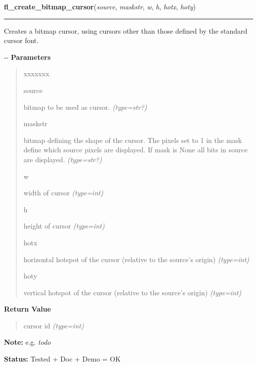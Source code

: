 \hspace{.8\funcindent}\begin{boxedminipage}{\funcwidth}

    \raggedright \textbf{fl\_create\_bitmap\_cursor}(\textit{source}, \textit{maskstr}, \textit{w}, \textit{h}, \textit{hotx}, \textit{hoty})

    \vspace{-1.5ex}

    \rule{\textwidth}{0.5\fboxrule}
\setlength{\parskip}{2ex}

Creates a bitmap cursor, using cursors other than those defined by
the standard cursor font.

-{}-
\setlength{\parskip}{1ex}
      \textbf{Parameters}
      \vspace{-1ex}

      \begin{quote}
        \begin{Ventry}{xxxxxxx}

          \item[source]


bitmap to be used as cursor.
            {\it (type=str?)}

          \item[maskstr]


bitmap defining the shape of the cursor. The pixels set to 1 in the
mask define which source pixels are displayed. If mask is None all
bits in source are displayed.
            {\it (type=str?)}

          \item[w]


width of cursor
            {\it (type=int)}

          \item[h]


height of cursor
            {\it (type=int)}

          \item[hotx]


horizontal hotspot of the cursor (relative to the source's origin)
            {\it (type=int)}

          \item[hoty]


vertical hotspot of the cursor (relative to the source's origin)
            {\it (type=int)}

        \end{Ventry}

      \end{quote}

      \textbf{Return Value}
    \vspace{-1ex}

      \begin{quote}

cursor id
      {\it (type=int)}

      \end{quote}

\textbf{Note:} 
e.g. \emph{todo}


\textbf{Status:} 
Tested + Doc + Demo = OK


    \end{boxedminipage}

